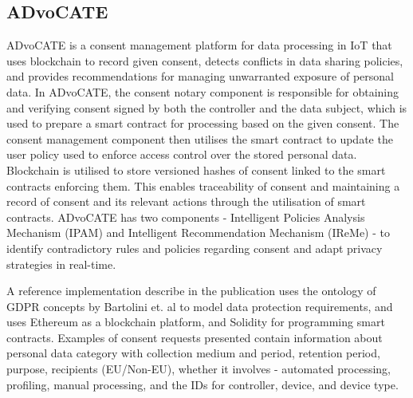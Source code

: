 \subsection*{ADvoCATE}
ADvoCATE \cite{rantos_advocate_2019} is a consent management platform for data processing in IoT that uses blockchain to record given consent, detects conflicts in data sharing policies, and provides recommendations for managing unwarranted exposure of personal data. In ADvoCATE, the consent notary component is responsible for obtaining and verifying consent signed by both the controller and the data subject, which is used to prepare a smart contract for processing based on the given consent. The consent management component then utilises the smart contract to update the user policy used to enforce access control over the stored personal data. Blockchain is utilised to store versioned hashes of consent linked to the smart contracts enforcing them. This enables traceability of consent and maintaining a record of consent and its relevant actions through the utilisation of smart contracts.
ADvoCATE has two components - Intelligent Policies Analysis Mechanism (IPAM) and Intelligent Recommendation Mechanism (IReMe) - to identify contradictory rules and policies regarding consent and adapt privacy strategies in real-time. 

A reference implementation describe in the publication uses the ontology of GDPR concepts by Bartolini et. al \cite{bartolini_using_2015} to model data protection requirements, and uses Ethereum as a blockchain platform, and Solidity for programming smart contracts. Examples of consent requests presented contain information about personal data category with collection medium and period, retention period, purpose, recipients (EU/Non-EU), whether it involves - automated processing, profiling, manual processing, and the IDs for controller, device, and device type.

